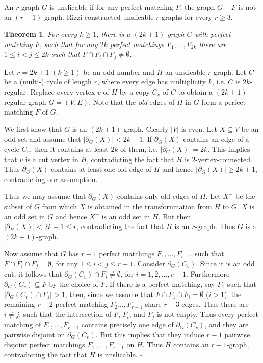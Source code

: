 \documentclass[fleqn,12pt]{article}
\newtheorem{theorem}{Theorem}
\newenvironment{proof}[1][Proof.]{\begin{trivlist}
\item[\hskip \labelsep {\bfseries #1}]}{\end{trivlist}}
\begin{document}
An $r$-graph $G$ is unslicable if for any perfect matching $F$, the graph $G-F$ is not an $(r-1)$-graph. Rizzi \cite{Rizzi} constructed unslicable $r$-graphs for every $r \geq 3$. 

\begin{theorem} For every $k \geq 1$, there is a $(2k+1)$-graph $G$ with perfect matching $F$, such that for any $2k$ perfect matchings $F_1, \dots, F_{2k}$ there are 
$1 \leq i < j \leq 2k$ such that $F \cap F_i \cap F_j \not =\emptyset$.
\end{theorem}

\begin{proof} Let $r = 2k+1$ $(k \geq 1)$ be an odd number and $H$ an unslicable $r$-graph. Let $C$ be a (multi-) cycle of length $r$, where every edge has multiplicity $k$, 
i.e. $C$ is $2k$-regular. Replace every vertex $v$ of $H$ by a copy $C_v$ of $C$ to obtain a $(2k+1)$-regular graph $G =(V,E)$. Note that the {\em old} edges of $H$ in $G$ form a 
perfect matching $F$ of $G$. 

We first show that $G$ is an $(2k+1)$-graph. Clearly $|V|$ is even. Let $X \subseteq V$ be an odd set and assume that $|\partial_G(X)| < 2k+1$. If $\partial_G(X)$ contains an edge of 
a cycle $C_v$, then it contains at least $2k$ of them, i.e. $|\partial_G(X)| = 2k$. This implies that $v$ is a cut vertex in $H$, contradicting the fact that $H$ is 2-vertex-connected. Thus 
$\partial_G(X)$ contains at least one old edge of $H$ and hence $|\partial_G(X)| \geq 2k+1$, contradicting our assumption. 

Thus we may assume that $\partial_G(X)$ contains only old edges of $H$. Let $X^-$ be the subset of $G$ from which $X$ is obtained in the transfornmation from $H$ to $G$. 
$X$ is an odd set in $G$ and hence 
$X^-$ is an odd set in $H$. But then $|\partial_H(X)| < 2k+1 \leq r$, contradicting the fact that $H$ is an $r$-graph. Thus $G$ is a $(2k+1)$-graph. 

Now assume that $G$ has $r-1$ perfect matchings $F_1, \dots ,F_{r-1}$ such that $F \cap F_i \cap F_j = \emptyset$, for any $1 \leq i < j \leq r-1$. 
Consider $\partial_G(C_v)$. Since it is an odd cut, it follows
that  $\partial_G(C_v) \cap F_i \not = \emptyset$, for $i=1,2,...,r-1$. Furthermore $\partial_G(C_v) \subseteq F$ by the choice of $F$. If there is a perfect matching, say $F_1$ such that 
$|\partial_G(C_v) \cap F_1| > 1$, then, since we assume that $F \cap F_1 \cap F_i = \emptyset$ ($i > 1$), the remaining $r-2$ perfect matching $F_2 \dots, F_{r-1}$ share $r-3$ edges.
Thus there are $i\not=j$, such that the intersection of $F$, $F_i$, and $F_j$ is not empty. 
Thus every perfect matching of $F_1,\dots,F_{r-1}$ contains precisely one edge of $\partial_G(C_v)$, and they are pairwise disjoint on $\partial_G(C_v)$. 
But this implies that they induce $r-1$ pairwise disjoint perfect matchings $F_1^-, \dots, F_{r-1}^-$ on $H$. Thus $H$ contains an $r-1$-graph, contradicting the fact that
$H$ is unslicable. $\square$
\end{proof}
\end{document}
